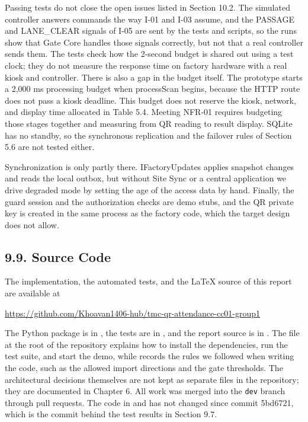 Passing tests do not close the open issues listed in Section 10.2. The simulated controller answers commands the way I-01 and I-03 assume, and the PASSAGE and LANE\_CLEAR signals of I-05 are sent by the tests and scripts, so the runs show that Gate Core handles those signals correctly, but not that a real controller sends them. The tests check how the 2-second budget is shared out using a test clock; they do not measure the response time on factory hardware with a real kiosk and controller. There is also a gap in the budget itself. The prototype starts a 2,000 ms processing budget when processScan begins, because the HTTP route does not pass a kiosk deadline. This budget does not reserve the kiosk, network, and display time allocated in Table 5.4. Meeting NFR-01 requires budgeting those stages together and measuring from QR reading to result display. SQLite has no standby, so the synchronous replication and the failover rules of Section 5.6 are not tested either.

Synchronization is only partly there. IFactoryUpdates applies snapshot changes and reads the local outbox, but without Site Sync or a central application we drive degraded mode by setting the age of the access data by hand. Finally, the guard session and the authorization checks are demo stubs, and the QR private key is created in the same process as the factory code, which the target design does not allow.


\subsection*{9.9. Source Code}

{}

The implementation, the automated tests, and the LaTeX source of this report are available at

\begin{center}
{\small\url{https://github.com/Khoavan1406-hub/tmc-qr-attendance-cc01-group1}}
\end{center}

The Python package is in , the tests are in , and the report source is in . The  file at the root of the repository explains how to install the dependencies, run the test suite, and start the demo, while  records the rules we followed when writing the code, such as the allowed import directions and the gate thresholds. The architectural decisions themselves are not kept as separate files in the repository; they are documented in Chapter 6. All work was merged into the \texttt{dev} branch through pull requests. The code in  and  has not changed since commit 5bd6721, which is the commit behind the test results in Section 9.7.
